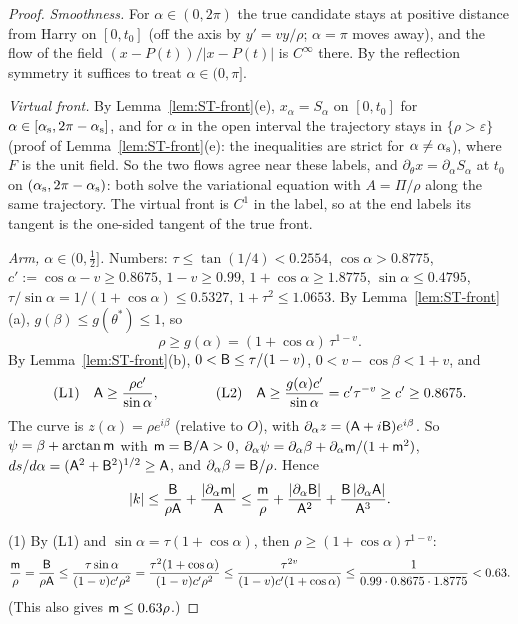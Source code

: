 \begin{proof}
\emph{Smoothness.} For $\alpha\in(0,2\pi)$ the true candidate stays at positive distance from Harry on $[0,t_0]$ (off the axis by
$y'=vy/\rho$; $\alpha=\pi$ moves away), and the flow of the field $(x-P(t))/|x-P(t)|$ is $C^\infty$ there. By the reflection symmetry
it suffices to treat $\alpha\in(0,\pi]$.

\emph{Virtual front.} By Lemma~\ref{lem:ST-front}(e), $x_\alpha=S_\alpha$ on $[0,t_0]$ for $\alpha\in[\alpha_{\mathrm s},2\pi-\alpha_{\mathrm s}]$, and for
$\alpha$ in the open interval the trajectory stays in $\{\rho>\varepsilon\}$ (proof of Lemma~\ref{lem:ST-front}(e): the inequalities
are strict for $\alpha\ne\alpha_{\mathrm s}$), where $F$ is the unit field. So the two flows agree near these labels, and
$\partial_\theta x=\partial_\alpha S_\alpha$ at $t_0$ on $(\alpha_{\mathrm s},2\pi-\alpha_{\mathrm s})$: both solve the variational equation with $A=\Pi/\rho$
along the same trajectory. The virtual front is $C^1$ in the label, so at the end labels its tangent is the one-sided tangent of the
true front.

\emph{Arm, $\alpha\in(0,\frac12]$.} Numbers: $\tau\le\tan(1/4)<0.2554$, $\cos\alpha>0.8775$, $c':=\cos\alpha-v\ge0.8675$,
$1-v\ge0.99$, $1+\cos\alpha\ge1.8775$, $\sin\alpha\le0.4795$, $\tau/\sin\alpha=1/(1+\cos\alpha)\le0.5327$, $1+\tau^2\le1.0653$.
By Lemma~\ref{lem:ST-front}(a), $g(\beta)\le g(\theta^*)\le1$, so
\[
\rho\ge g(\alpha)=(1+\cos\alpha)\,\tau^{1-v}.
\]
By Lemma~\ref{lem:ST-front}(b), $0<\mathsf B\le\tau/(1-v)$, $0<v-\cos\beta<1+v$, and
\[
\textup{(L1)}\quad\mathsf A\ge\frac{\rho c'}{\sin\alpha},\qquad\qquad
\textup{(L2)}\quad\mathsf A\ge\frac{g(\alpha)c'}{\sin\alpha}=c'\tau^{-v}\ge c'\ge0.8675 .
\]
The curve is $z(\alpha)=\rho e^{i\beta}$ (relative to $O$), with $\partial_\alpha z=(\mathsf A+i\mathsf B)e^{i\beta}$. So
$\psi=\beta+\arctan\mathsf m$ with $\mathsf m=\mathsf B/\mathsf A>0$, $\partial_\alpha\psi=\partial_\alpha\beta+\partial_\alpha\mathsf m/(1+\mathsf m^2)$,
$ds/d\alpha=(\mathsf A^2+\mathsf B^2)^{1/2}\ge\mathsf A$, and $\partial_\alpha\beta=\mathsf B/\rho$. Hence
\begin{equation}\label{eq:ST-kappa}
|k|\le\frac{\mathsf B}{\rho\mathsf A}+\frac{|\partial_\alpha\mathsf m|}{\mathsf A}
\le\frac{\mathsf m}\rho+\frac{|\partial_\alpha\mathsf B|}{\mathsf A^2}+\frac{\mathsf B\,|\partial_\alpha\mathsf A|}{\mathsf A^3}.
\end{equation}

(1) By (L1) and $\sin\alpha=\tau(1+\cos\alpha)$, then $\rho\ge(1+\cos\alpha)\tau^{1-v}$:
\[
\frac{\mathsf m}\rho=\frac{\mathsf B}{\rho\mathsf A}\le\frac{\tau\sin\alpha}{(1-v)c'\rho^2}=\frac{\tau^2(1+\cos\alpha)}{(1-v)c'\rho^2}
\le\frac{\tau^{2v}}{(1-v)c'(1+\cos\alpha)}\le\frac1{0.99\cdot0.8675\cdot1.8775}<0.63 .
\]
(This also gives $\mathsf m\le0.63\rho$.)


\end{proof}
